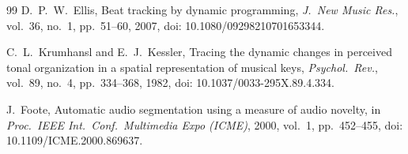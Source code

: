 \documentclass[conference,a4paper]{IEEEtran}
\newcommand{\q}[1]{\textquotedbl{}#1\textquotedbl{}}
\begin{document}
\begin{thebibliography}{99}
D.~P.~W.~Ellis, \q{Beat tracking by dynamic programming,} \emph{J.\ New Music Res.}, vol.~36,
no.~1, pp.~51--60, 2007, doi: 10.1080/09298210701653344.

C.~L.~Krumhansl and E.~J.~Kessler, \q{Tracing the dynamic changes in perceived tonal organization
in a spatial representation of musical keys,} \emph{Psychol.\ Rev.}, vol.~89, no.~4,
pp.~334--368, 1982, doi: 10.1037/0033-295X.89.4.334.

J.~Foote, \q{Automatic audio segmentation using a measure of audio novelty,} in \emph{Proc.\ IEEE
Int.\ Conf.\ Multimedia Expo (ICME)}, 2000, vol.~1, pp.~452--455, doi: 10.1109/ICME.2000.869637.

\end{thebibliography}
\end{document}
